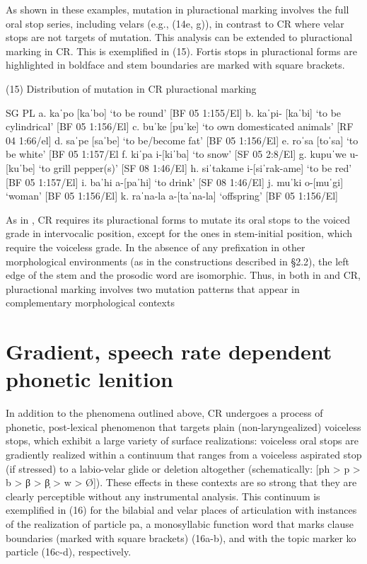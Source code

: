 As shown in these examples, mutation in pluractional marking involves the full oral stop series, including velars (e.g., (14e, g)), in contrast to CR where velar stops are not targets of mutation.
	This analysis can be extended to pluractional marking in CR. This is exemplified in (15). Fortis stops in pluractional forms are highlighted in boldface and stem boundaries are marked with square brackets.

(15)	Distribution of mutation in CR pluractional marking

	SG			PL
a.	kaˈpo	 	[kaˈbo]			‘to be round’				[BF 05 1:155/El]
b.	kaˈpi-		[kaˈbi]			‘to be cylindrical’			[BF 05 1:156/El]
c.	buˈke		[puˈke]			‘to own domesticated animals’		[RF 04 1:66/el]
d.	saˈpe		[saˈbe]			‘to be/become fat’			[BF 05 1:156/El]
e.	roˈsa		[toˈsa]			‘to be white’				[BF 05 1:157/El
f.	kiˈpa 		i-[kiˈba]		‘to snow’				[SF 05 2:8/El]
g.	kupuˈwe		u-[kuˈbe]		‘to grill pepper(s)’			[SF 08 1:46/El]
h.	siˈtakame 		i-[siˈrak-ame] 		‘to be red’				[BF 05 1:157/El]
i.	baˈhi 		a-[paˈhi]		‘to drink’				[SF 08 1:46/El]
j.	muˈki		o-[muˈgi]		‘woman’				[BF 05 1:156/El]
k.	raˈna-la		a-[taˈna-la]		‘offspring’				[BF 05 1:156/El]

As in , CR requires its pluractional forms to mutate its oral stops to the voiced grade in intervocalic position, except for the ones in stem-initial position, which require the voiceless grade. In the absence of any prefixation in other morphological environments (as in the constructions described in §2.2), the left edge of the stem and the prosodic word are isomorphic. Thus, in both in  and CR, pluractional marking involves two mutation patterns that appear in complementary morphological contexts


\section{Gradient, speech rate dependent phonetic lenition}
\label{sec: gradient, speech rate dependent phonetic lenition}

In addition to the phenomena outlined above, CR undergoes a process of phonetic, post-lexical phenomenon that targets plain (non-laryngealized) voiceless stops, which exhibit a large variety of surface realizations: voiceless oral stops are gradiently realized within a continuum that ranges from a voiceless aspirated stop (if stressed) to a labio-velar glide or deletion altogether (schematically: [ph > p > b > β > β̩ > w > Ø]). These effects in these contexts are so strong that they are clearly perceptible without any instrumental analysis. This continuum is exemplified in (16) for the bilabial and velar places of articulation with instances of the realization of particle pa, a monosyllabic function word that marks clause boundaries (marked with square brackets) (16a-b), and with the topic marker ko particle (16c-d), respectively.

